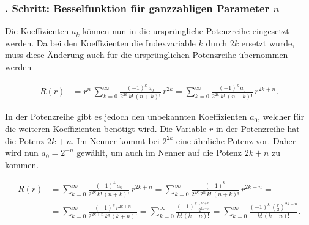 \subsubsection{. Schritt: Besselfunktion f\"ur ganzzahligen Parameter $n$}
\begin{normalsize}%
Die Koeffizienten $a_k$ k\"onnen nun in die urspr\"ungliche Potenzreihe  eingesetzt werden.
Da bei den Koeffizienten die Indexvariable $k$ durch $2k$ ersetzt wurde,
muss diese \"Anderung auch f\"ur die urspr\"unglichen Potenzreihe \"ubernommen werden
\end{normalsize}
\begin{align}
	R \left( r \right)
	&=
	r^{n} \,
	\sum_{k=0}^{\infty}
	\frac
	{
		\left( -1 \right) ^k \, a_0
	}{
		2^{2k} \, {k}! \, {\left( n + k \right)}!
	}
	\, r^{2k}
	=
	\sum_{k=0}^{\infty}
	\frac
	{
		\left( -1 \right) ^k \, a_0
	}{
		2^{2k} \, {k}! \, {\left( n + k \right)}!
	}
	\, r^{2k + n}
	\label{eq:bessel:potenzreihe:koeffizienten:eingesetzt}
	\text{.}
\end{align}
\begin{normalsize}%
In der Potenzreihe  gibt es jedoch den unbekannten Koeffizienten $a_0$,
welcher f\"ur die weiteren Koeffizienten ben\"otigt wird.
Die Variable $r$ in der Potenzreihe  hat die Potenz $2k + n$.
Im Nenner kommt bei $2^{2k}$ eine \"ahnliche Potenz vor.
Daher wird nun $a_0 = 2^{-n}$ gew\"ahlt,
um auch im Nenner auf die Potenz $2k + n$ zu kommen.
\end{normalsize}
\begin{align*}
	R \left( r \right)
	&=
	\sum_{k=0}^{\infty}
	\frac
	{
		\left( -1 \right) ^k \, a_0
	}{
		2^{2k} \, {k}! \, {\left( n + k \right)}!
	}
	\, r^{2k + n}
	=
	\sum_{k=0}^{\infty}
	\frac
	{
		\left( -1 \right) ^k
	}{
		2^{2k} \, 2^n \, {k}! \, {\left( n + k \right)}!
	}
	\, r^{2k + n}
	=
	\\
	&=
	\sum_{k=0} ^{\infty}
	\frac
	{
		\left( - 1 \right) ^k \, r ^{2k+n}
	}{
		2^{2k+n} \, {k}! \, { \left( k + n \right) }!
	}
	=
	\sum_{k=0} ^{\infty}
	\frac
	{
		\left( - 1 \right) ^k \, 
		\frac
		{
			r ^{2k+n}
		}{
			2^{2k+n}
		}
	}{
		{k}! \, { \left( k + n \right) }!
	}
	=
	\sum_{k=0} ^{\infty}
	\frac
	{
		\left( - 1 \right) ^k \, 
		\left(		
		\frac
		{
			r
		}{
			2
		} \right) ^{2k+n}
	}{
		{k}! \, { \left( k + n \right) }!
	}
	\text{.}
\end{align*}
